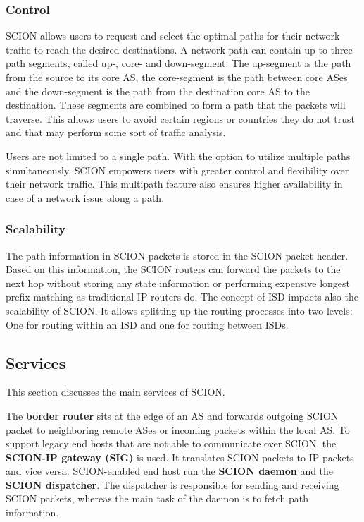 \subsubsection{Control}

SCION allows users to request and select the optimal paths for their network traffic to reach the desired destinations.
A network path can contain up to three path segments, called up-, core- and down-segment.
The up-segment is the path from the source to its core AS, the core-segment is the path between core ASes and the down-segment is the path from the destination core AS to the destination.
These segments are combined to form a path that the packets will traverse.
This allows users to avoid certain regions or countries they do not trust and that may perform some sort of traffic analysis.

Users are not limited to a single path.
With the option to utilize multiple paths simultaneously, SCION empowers users with greater control and flexibility over their network traffic.
This multipath feature also ensures higher availability in case of a network issue along a path.


\subsubsection{Scalability}

The path information in SCION packets is stored in the SCION packet header.
Based on this information, the SCION routers can forward the packets to the next hop without storing any state information or performing expensive longest prefix matching as traditional IP routers do.
The concept of ISD impacts also the scalability of SCION.
It allows splitting up the routing processes into two levels:
One for routing within an ISD and one for routing between ISDs.


\subsection{Services}
This section discusses the main services of SCION.

The \textbf{border router} sits at the edge of an AS and forwards outgoing SCION packet to neighboring remote ASes or incoming packets within the local AS.
To support legacy end hosts that are not able to communicate over SCION, the \textbf{SCION-IP gateway (SIG)} is used.
It translates SCION packets to IP packets and vice versa.
SCION-enabled end host run the \textbf{SCION daemon} and the \textbf{SCION dispatcher}.
The dispatcher is responsible for sending and receiving SCION packets, whereas the main task of the daemon is to fetch path information.

